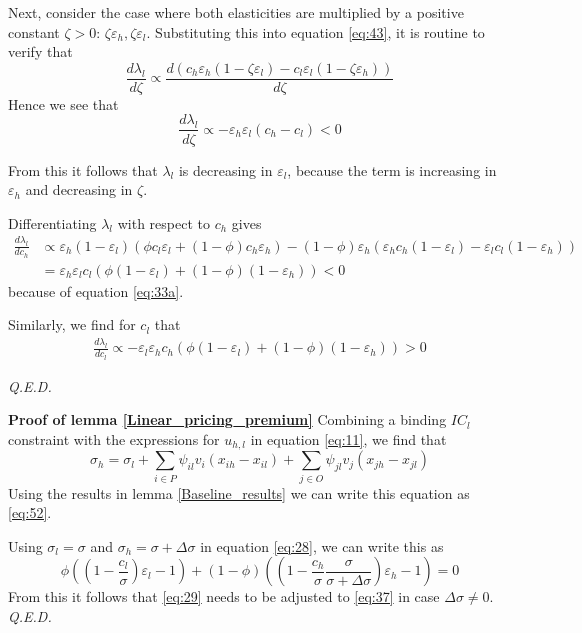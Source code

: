 \documentclass[12pt,english,a4paper]{article}
\newcommand{\qed}{\hspace*{\fill} {\em Q.E.D.}}
\begin{document}
Next, consider the case where both elasticities are multiplied by a positive constant \(\zeta>0\): \(\zeta \varepsilon_{h} ,\zeta \varepsilon_{l}\). Substituting this into equation \eqref{eq:43}, it is routine to verify that
\begin{equation}
\label{eq:32}
\frac{d \lambda_l}{d \zeta} \propto \frac{d(c_h \varepsilon_h (1- \zeta \varepsilon_l )-c_l \varepsilon_l(1-\zeta \varepsilon_h))}{d \zeta}
\end{equation}
Hence we see that
\begin{equation}
\label{eq:35}
\frac{d \lambda_l}{d \zeta} \propto - \varepsilon_h \varepsilon_l (c_h-c_l) < 0
\end{equation}

From this it follows that \(\lambda_l\) is decreasing in \(\varepsilon_l\), because the term is increasing in \(\varepsilon_h\) and decreasing in \(\zeta\).

Differentiating \(\lambda_l\) with respect to \(c_h\) gives
\begin{align*}
\frac{d \lambda_l}{d c_h} &\propto \varepsilon_h (1-\varepsilon_l)(\phi c_l\varepsilon_l+(1-\phi)c_h \varepsilon_h) - (1-\phi) \varepsilon_h (\varepsilon_h c_h (1-\varepsilon_l) - \varepsilon_l c_l (1-\varepsilon_h)) \\
 &= \varepsilon_h \varepsilon_l c_l (\phi(1-\varepsilon_l)+(1-\phi)(1-\varepsilon_h)) <0
\end{align*}
because of equation \eqref{eq:33a}.

Similarly, we find for \(c_l\) that
\begin{align*}
\frac{d \lambda_l}{d c_l} \propto -\varepsilon_l \varepsilon_h c_h (\phi (1-\varepsilon_l) + (1-\phi) (1-\varepsilon_h)) >0
\end{align*}

 \qed

\textbf{Proof of lemma \ref{Linear_pricing_premium}}
Combining a binding \(IC_l\) constraint with the expressions for \(u_{h,l}\) in equation \eqref{eq:11}, we find that
\begin{equation}
\label{eq:53}
\sigma_h = \sigma_l + \sum_{i \in P} \psi_{il}v_i (x_{ih}-x_{il}) + \sum_{j \in O} \psi_{jl} v_j (x_{jh}-x_{jl})
\end{equation}
Using the results in lemma \ref{Baseline_results} we can write this equation as \eqref{eq:52}.

Using \(\sigma_l=\sigma\) and \(\sigma_h=\sigma+\Delta\sigma\) in equation \eqref{eq:28}, we can write this as
\begin{equation}
\label{eq:54}
\phi \left( (1 -\frac{c_l}{\sigma})\varepsilon_l -1 \right) + (1-\phi) \left( (1 - \frac{c_h}{\sigma} \frac{\sigma}{\sigma + \Delta \sigma}) \varepsilon_h -1  \right) = 0
\end{equation}
From this it follows that \eqref{eq:29} needs to be adjusted to \eqref{eq:37} in case \(\Delta \sigma \neq 0\). 
 \qed
\end{document}
